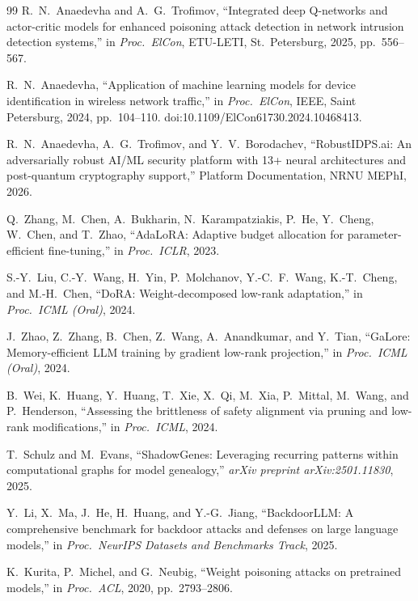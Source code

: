 \documentclass[12pt,a4paper]{article}
\theoremstyle{definition}
\theoremstyle{remark}
\begin{document}
\begin{thebibliography}{99}
R.~N.~Anaedevha and A.~G.~Trofimov, ``Integrated deep {Q}-networks and actor-critic models for enhanced poisoning attack detection in network intrusion detection systems,'' in \emph{Proc.\ ElCon}, ETU-LETI, St.~Petersburg, 2025, pp.~556--567.

R.~N.~Anaedevha, ``Application of machine learning models for device identification in wireless network traffic,'' in \emph{Proc.\ ElCon}, IEEE, Saint Petersburg, 2024, pp.~104--110. doi:10.1109/ElCon61730.2024.10468413.

R.~N.~Anaedevha, A.~G.~Trofimov, and Y.~V.~Borodachev, ``{RobustIDPS.ai}: An adversarially robust AI/ML security platform with 13+ neural architectures and post-quantum cryptography support,'' Platform Documentation, NRNU MEPhI, 2026.

Q.~Zhang, M.~Chen, A.~Bukharin, N.~Karampatziakis, P.~He, Y.~Cheng, W.~Chen, and T.~Zhao, ``{AdaLoRA}: Adaptive budget allocation for parameter-efficient fine-tuning,'' in \emph{Proc.\ ICLR}, 2023.

S.-Y.~Liu, C.-Y.~Wang, H.~Yin, P.~Molchanov, Y.-C.~F.~Wang, K.-T.~Cheng, and M.-H.~Chen, ``{DoRA}: Weight-decomposed low-rank adaptation,'' in \emph{Proc.\ ICML (Oral)}, 2024.

J.~Zhao, Z.~Zhang, B.~Chen, Z.~Wang, A.~Anandkumar, and Y.~Tian, ``{GaLore}: Memory-efficient {LLM} training by gradient low-rank projection,'' in \emph{Proc.\ ICML (Oral)}, 2024.

B.~Wei, K.~Huang, Y.~Huang, T.~Xie, X.~Qi, M.~Xia, P.~Mittal, M.~Wang, and P.~Henderson, ``Assessing the brittleness of safety alignment via pruning and low-rank modifications,'' in \emph{Proc.\ ICML}, 2024.

T.~Schulz and M.~Evans, ``{ShadowGenes}: Leveraging recurring patterns within computational graphs for model genealogy,'' \emph{arXiv preprint arXiv:2501.11830}, 2025.

Y.~Li, X.~Ma, J.~He, H.~Huang, and Y.-G.~Jiang, ``{BackdoorLLM}: A comprehensive benchmark for backdoor attacks and defenses on large language models,'' in \emph{Proc.\ NeurIPS Datasets and Benchmarks Track}, 2025.

K.~Kurita, P.~Michel, and G.~Neubig, ``Weight poisoning attacks on pretrained models,'' in \emph{Proc.\ ACL}, 2020, pp.~2793--2806.


\end{thebibliography}
\end{document}
